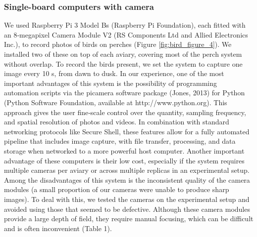 \documentclass[11pt,a4paper,oneside]{book}
\begin{document}
\begin{doublespace}
\subsubsection{Single-board computers with camera}
We used Raspberry Pi 3 Model Bs (Raspberry Pi Foundation), each fitted with an 8‐megapixel Camera Module V2 (RS Components Ltd and Allied Electronics Inc.), to record photos of birds on perches (Figure \ref{fig:bird_figure_4}). We installed two of these on top of each aviary, covering most of the perch system without overlap. To record the birds present, we set the system to capture one image every 10 s, from dawn to dusk. In our experience, one of the most important advantages of this system is the possibility of programming automation scripts via the picamera software package (Jones, 2013) for Python (Python Software Foundation, available at http://www.python.org). This approach gives the user fine‐scale control over the quantity, sampling frequency, and spatial resolution of photos and videos. In combination with standard networking protocols like Secure Shell, these features allow for a fully automated pipeline that includes image capture, with file transfer, processing, and data storage when networked to a more powerful host computer. Another important advantage of these computers is their low cost, especially if the system requires multiple cameras per aviary or across multiple replicas in an experimental setup. Among the disadvantages of this system is the inconsistent quality of the camera modules (a small proportion of our cameras were unable to produce sharp images). To deal with this, we tested the cameras on the experimental setup and avoided using those that seemed to be defective. Although these camera modules provide a large depth of field, they require manual focusing, which can be difficult and is often inconvenient (Table 1).


\end{doublespace}
\end{document}
